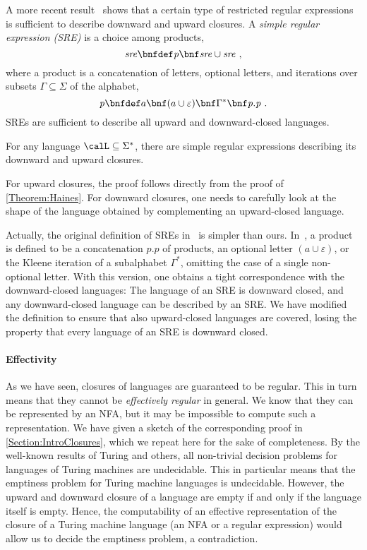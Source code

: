 \documentclass[../../diss.tex]{subfiles}
\begin{document}
A more recent result~\cite{AbdullaCBJ04} shows that a certain type of restricted regular expressions is sufficient to describe downward and upward closures.
A \emph{simple regular expression (SRE)} is a choice among products,
\[
     \sre \bnfdef \product \bnf \sre \cup \sre
     \ ,
\]
where a product is a concatenation of letters, optional letters, and iterations over subsets $\Gamma\subseteq \Sigma$ of the alphabet,
\[
    \product \bnfdef a \bnf (a\cup\varepsilon)\bnf\Gamma^*\bnf\product.\product
    \ .
\]
SREs are sufficient to describe all upward and downward-closed languages.

\begin{theorem}
    For any language $\calL \subseteq \Sigma^*$, there are simple regular expressions describing its downward and upward closures.
\end{theorem}

For upward closures, the proof follows directly from the proof of \cref{Theorem:Haines}.
For downward closures, one needs to carefully look at the shape of the language obtained by complementing an upward-closed language.

Actually, the original definition of SREs in~\cite{AbdullaCBJ04} is simpler than ours.
In~\cite{AbdullaCBJ04}, a product is defined to be a concatenation $p.p$ of products, an optional letter $(a\cup\varepsilon)$, or the Kleene iteration of a subalphabet $\Gamma^*$, omitting the case of a single non-optional letter.
With this version, one obtains a tight correspondence with the downward-closed languages:
The language of an SRE is downward closed, and any downward-closed language can be described by an SRE.\@
We have modified the definition to ensure that also upward-closed languages are covered, losing the property that every language of an SRE is downward closed.

\paragraph{Effectivity}

As we have seen, closures of languages are guaranteed to be regular.
This in turn means that they cannot be \emph{effectively regular} in general.
We know that they can be represented by \eg an NFA, but it may be impossible to compute such a representation.
We have given a sketch of the corresponding proof in \cref{Section:IntroClosures}, which we repeat here for the sake of completeness.
By the well-known results of Turing and others, all non-trivial decision problems for languages of Turing machines are undecidable.
This in particular means that the emptiness problem for Turing machine languages is undecidable.
However, the upward and downward closure of a language are empty if and only if the language itself is empty.
Hence, the computability of an effective representation of the closure of a Turing machine language (\eg an NFA or a regular expression) would allow us to decide the emptiness problem, a contradiction.
\end{document}
